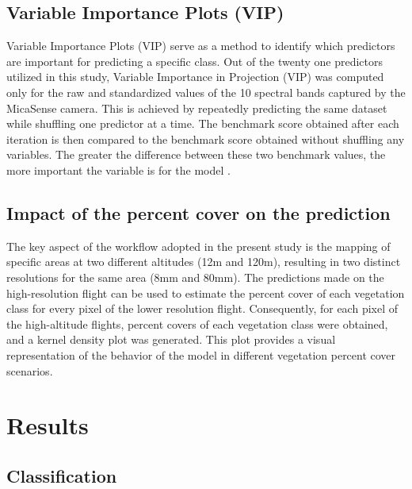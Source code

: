 \documentclass[
  number]{elsarticle}
\begin{document}
\subsection{Variable Importance Plots
(VIP)}\label{variable-importance-plots-vip}

Variable Importance Plots (VIP) serve as a method to identify which
predictors are important for predicting a specific class. Out of the
twenty one predictors utilized in this study, Variable Importance in
Projection (VIP) was computed only for the raw and standardized values
of the 10 spectral bands captured by the MicaSense camera. This is
achieved by repeatedly predicting the same dataset while shuffling one
predictor at a time. The benchmark score obtained after each iteration
is then compared to the benchmark score obtained without shuffling any
variables. The greater the difference between these two benchmark
values, the more important the variable is for the model
\citep{WEI2015399}.

\subsection{Impact of the percent cover on the
prediction}\label{impact-of-the-percent-cover-on-the-prediction}

The key aspect of the workflow adopted in the present study is the
mapping of specific areas at two different altitudes (12m and 120m),
resulting in two distinct resolutions for the same area (8mm and 80mm).
The predictions made on the high-resolution flight can be used to
estimate the percent cover of each vegetation class for every pixel of
the lower resolution flight. Consequently, for each pixel of the
high-altitude flights, percent covers of each vegetation class were
obtained, and a kernel density plot was generated. This plot provides a
visual representation of the behavior of the model in different
vegetation percent cover scenarios.

\section{Results}\label{results}

\subsection{Classification}\label{classification}
\end{document}
